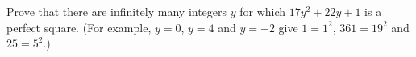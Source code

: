 Prove that there are infinitely many integers $y$ for which $17y^2+22y+1$ is a perfect square. (For example, $y=0$, $y=4$ and $y=-2$ give $1=1^2$, $361=19^2$ and $25=5^2$.)
